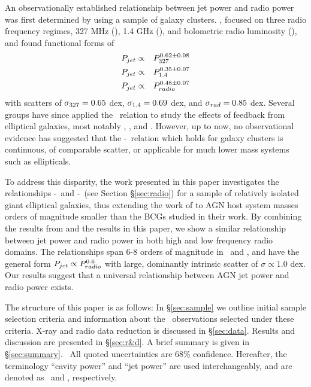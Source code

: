 \documentclass{emulateapj}
\begin{document}
An observationally established relationship between jet power and
radio power was first determined by \citet{birzan04, birzan08} using a
sample of galaxy clusters. \citet{birzan08}, focused on three radio
frequency regimes, 327 MHz (\pthree), 1.4 GHz (\phigh), and bolometric
radio luminosity (\prad), and found functional forms of
\begin{eqnarray}
P_{jet} &\propto& P_{\mathrm{327}}^{0.62 \pm 0.08}\\
P_{jet} &\propto& P_{\mathrm{1.4}}^{0.35 \pm 0.07}\\
P_{jet} &\propto& P_{radio}^{0.48 \pm 0.07}
\end{eqnarray}
with scatters of $\sigma_{\mathrm{327}} = 0.65$ dex, $\sigma_{\mathrm{1.4}} = 0.69$ dex, and $\sigma_{rad}
= 0.85$ dex. Several groups have since applied the \birzan\ relation
to study the effects of feedback from elliptical galaxies, most
notably \citet{best07}, \citet{2007MNRAS.379..260M}, and
\citet{2009arXiv0908.3158H}. However, up to now, no observational
evidence has suggested that the \pjet-\prad\ relation which holds for
galaxy clusters is continuous, of comparable scatter, or applicable
for much lower mass systems such as ellipticals.

To address this disparity, the work presented in this paper
investigates the relationships \pjet-\phigh\ and \pjet-\plow\ (see
Section \S\ref{sec:radio}) for a sample of relatively isolated giant
elliptical galaxies, thus extending the work of \citet{birzan08} to
AGN host system masses orders of magnitude smaller than the BCGs
studied in their work. By combining the results from \citet{birzan08}
and the results in this paper, we show a similar relationship between
jet power and radio power in both high and low frequency radio
domains. The relationships span 6-8 orders of magnitude in \pjet\ and
\prad, and have the general form $P_{jet} \propto P_{radio}^{0.6}$ with
large, dominantly intrinsic scatter of $\sigma \propto 1.0$ dex. Our
results suggest that a universal relationship between AGN jet power
and radio power exists.

The structure of this paper is as follows: In \S\ref{sec:sample} we
outline initial sample selection criteria and information about the
\chandra\ observations selected under these criteria. X-ray and radio
data reduction is discussed in \S\ref{sec:data}. Results and
discussion are presented in \S\ref{sec:r&d}. A brief summary is given
in \S\ref{sec:summary}. \LCDM\ All quoted uncertainties are 68\%
confidence. Hereafter, the terminology ``cavity power'' and ``jet
power'' are used interchangeably, and are denoted as \pcav\ and \pjet,
respectively.
\end{document}
